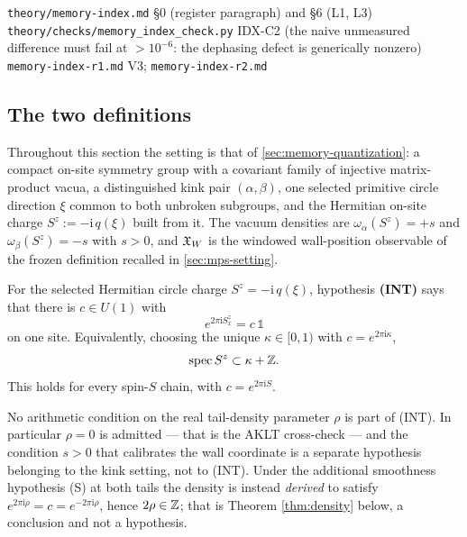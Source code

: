 {\texttt{theory/memory-index.md} \S0 (register paragraph) and \S6 (L1, L3)}
{\texttt{theory/checks/memory\_index\_check.py} IDX-C2 (the naive unmeasured
 difference must fail at $>10^{-6}$: the dephasing defect is generically
 nonzero)}
{\texttt{memory-index-r1.md} V3; \texttt{memory-index-r2.md}}

\subsection{The two definitions}

Throughout this section the setting is that of \cref{sec:memory-quantization}:
a compact on-site symmetry group with a covariant family of injective
matrix-product vacua, a distinguished kink pair $(\alpha,\beta)$, one selected
primitive circle direction $\xi$ common to both unbroken subgroups, and the
Hermitian on-site charge $S^z:=-\mathrm{i}\,q(\xi)$ built from it. The vacuum
densities are $\omega_\alpha(S^z)=+s$ and $\omega_\beta(S^z)=-s$ with $s>0$,
and $\mathfrak{X}_W$ is the windowed wall-position observable of the frozen
definition recalled in \cref{sec:mps-setting}.

\begin{definition}
\label{def:int}
For the selected Hermitian circle charge $S^z=-\mathrm{i}\,q(\xi)$,
hypothesis \textbf{(INT)} says that there is $c\in U(1)$ with
\begin{equation}
  e^{2\pi\mathrm{i}S^z_x}=c\,\mathbb{1}
  \label{eq:int}
\end{equation}
on one site. Equivalently, choosing the unique $\kappa\in[0,1)$ with
$c=e^{2\pi\mathrm{i}\kappa}$,
\begin{equation}
  \operatorname{spec} S^z\subset\kappa+\mathbb{Z} .
  \label{eq:int-coset}
\end{equation}
This holds for every spin-$S$ chain, with $c=e^{2\pi\mathrm{i}S}$.

No arithmetic condition on the real tail-density parameter $\rho$ is part of
(INT). In particular $\rho=0$ is admitted --- that is the AKLT cross-check
--- and the condition $s>0$ that calibrates the wall coordinate is a separate
hypothesis belonging to the kink setting, not to (INT). Under the additional
smoothness hypothesis (S) at both tails the density is instead \emph{derived}
to satisfy $e^{2\pi\mathrm{i}\rho}=c=e^{-2\pi\mathrm{i}\rho}$, hence
$2\rho\in\mathbb{Z}$; that is Theorem \ref{thm:density} below, a conclusion and not a
hypothesis.
\end{definition}

